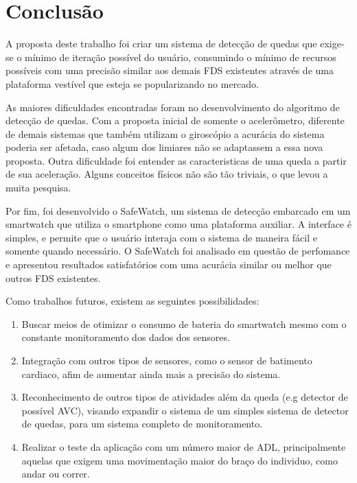 \chapter{Conclusão}
\label{ch:conclusion}

A proposta deste trabalho foi criar um sistema de detecção de quedas que exige-se o mínimo de iteração possível do usuário, consumindo o mínimo de recursos possíveis com uma precisão similar aos demais \ac{FDS} existentes através de uma plataforma vestível que esteja se popularizando no mercado. 

As maiores dificuldades encontradas foram no desenvolvimento do algoritmo de detecção de quedas. Com a proposta inicial de somente o acelerômetro, diferente de demais sistemas que também utilizam o giroscópio a acurácia do sistema poderia ser afetada, caso algum dos limiares não se adaptassem a essa nova proposta. Outra dificuldade foi entender as caracteristicas de uma queda a partir de sua aceleração. Alguns conceitos físicos não são tão triviais, o que levou a muita pesquisa.  

Por fim, foi desenvolvido o SafeWatch, um sistema de detecção embarcado em um smartwatch que utiliza o smartphone como uma plataforma auxiliar. A interface é simples, e permite que o usuário interaja com o sistema de maneira fácil e somente quando necessário. O SafeWatch foi analisado em questão de perfomance e apresentou resultados satisfatórios com uma acurácia similar ou melhor que outros \ac{FDS} existentes.

Como trabalhos futuros, existem as seguintes possibilidades:

	\begin{enumerate}
		\item Buscar meios de otimizar o consumo de bateria do smartwatch mesmo com o constante monitoramento dos dados dos sensores.
		\item Integração com outros tipos de sensores, como o sensor de batimento cardiaco, afim de aumentar ainda mais a precisão do sistema.
		\item Reconhecimento de outros tipos de atividades além da queda (e.g detector de possível AVC),  visando expandir o sistema de um simples sistema de detector de quedas, para um sistema completo de monitoramento. 
		\item Realizar o teste da aplicação com um número maior de \ac{ADL}, principalmente aquelas que exigem uma movimentação maior do braço do individuo, como andar ou correr. 
 
	\end{enumerate}



